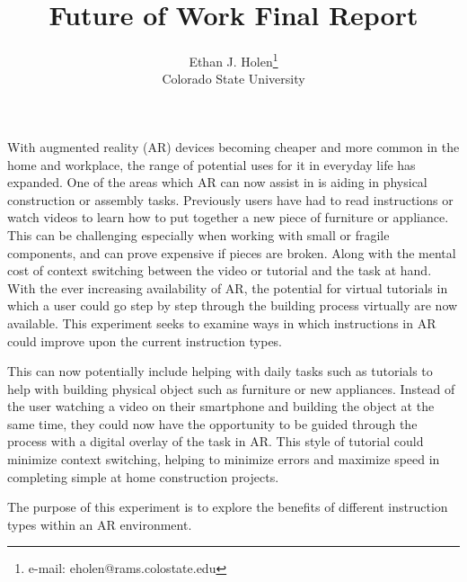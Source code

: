 \documentclass{vgtc}                          %
\title{Future of Work Final Report}
\author{Ethan J. Holen\thanks{e-mail: eholen@rams.colostate.edu}\\ %
        \scriptsize Colorado State University %
}
\begin{document}





\maketitle


With augmented reality (AR) devices becoming cheaper and more common in the home and workplace, the range of potential uses for it in everyday life has expanded. One of the areas which AR can now assist in is aiding in physical construction or assembly tasks. Previously users have had to read instructions or watch videos to learn how to put together a new piece of furniture or appliance. This can be challenging especially when working with small or fragile components, and can prove expensive if pieces are broken. Along with the mental cost of context switching between the video or tutorial and the task at hand. With the ever increasing availability of AR, the potential for virtual tutorials in which a user could go step by step through the building process virtually are now available. This experiment seeks to examine ways in which instructions in AR could improve upon the current instruction types.

This can now potentially include helping with daily tasks such as tutorials to help with building physical object such as furniture or new appliances. Instead of the user watching a video on their smartphone and building the object at the same time, they could now have the opportunity to be guided through the process with a digital overlay of the task in AR. This style of tutorial could minimize context switching, helping to minimize errors and maximize speed in completing simple at home construction projects.

The purpose of this experiment is to explore the benefits of different instruction types within an AR environment.
\end{document}
